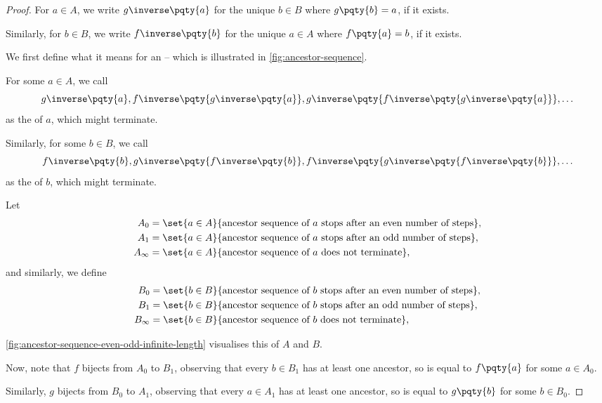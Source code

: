 \begin{proof}
    For \(a \in A\), we write \(g\inverse\pqty{a}\) for the unique \(b \in B\) where \(g\pqty{b} = a\), if it exists.

    Similarly, for \(b \in B\), we write \(f\inverse\pqty{b}\) for the unique \(a \in A\) where \(f\pqty{a} = b\), if it exists.

    We first define what it means for an  -- which is illustrated in \autoref{fig:ancestor-sequence}.

    For some \(a \in A\), we call
    \[
        g\inverse\pqty{a}, f\inverse \pqty{g\inverse \pqty{a}}, g\inverse \pqty{f\inverse \pqty{g\inverse \pqty{a}}}, \ldots
    \]
    as the  of \(a\), which might terminate.

    Similarly, for some \(b \in B\), we call
    \[
        f\inverse\pqty{b}, g\inverse \pqty{f\inverse \pqty{b}}, f\inverse \pqty{g\inverse \pqty{f\inverse \pqty{b}}}, \ldots
    \]
    as the  of \(b\), which might terminate.

    Let
    \begin{align*}
        A_0 &= \set{a \in A}{\text{ancestor sequence of } a \text{ stops after an even number of steps}}, \\
        A_1 &= \set{a \in A}{\text{ancestor sequence of } a \text{ stops after an odd number of steps}}, \\
        A_{\infty} &= \set{a \in A}{\text{ancestor sequence of } a \text{ does not terminate}},
    \end{align*}
    and similarly, we define
    \begin{align*}
        B_0 &= \set{b \in B}{\text{ancestor sequence of } b \text{ stops after an even number of steps}}, \\
        B_1 &= \set{b \in B}{\text{ancestor sequence of } b \text{ stops after an odd number of steps}}, \\
        B_{\infty} &= \set{b \in B}{\text{ancestor sequence of } b \text{ does not terminate}},
    \end{align*}

    \autoref{fig:ancestor-sequence-even-odd-infinite-length} visualises this  of \(A\) and \(B\).
    
    Now, note that \(f\) bijects from \(A_0\) to \(B_1\), observing that every \(b \in B_1\) has at least one ancestor, so is equal to \(f\pqty{a}\) for some \(a \in A_0\).

    Similarly, \(g\) bijects from \(B_0\) to \(A_1\), observing that every \(a \in A_1\) has at least one ancestor, so is equal to \(g\pqty{b}\) for some \(b \in B_0\).


\end{proof}
